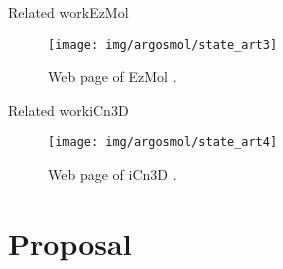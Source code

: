 \documentclass[10pt]{beamer}
\newcommand{\1}{
        	\setbeamertemplate{background}{
        		\texttt{[image: img/1]}
        		\tikz[overlay] \fill[fill opacity=0.75,fill=white] (0,0) rectangle (-\paperwidth,\paperheight);
        	}
}
\begin{document}
\begin{frame}{Related work}{EzMol}	
	\begin{figure}
		\centering
		\texttt{[image: img/argosmol/state\_art3]}
		\caption{Web page of EzMol \cite{reynolds2018ezmol}.}
	\end{figure}
\end{frame}

\begin{frame}{Related work}{iCn3D}	
	\begin{figure}
		\centering
		\texttt{[image: img/argosmol/state\_art4]}
		\caption{Web page of iCn3D \cite{wang2020icn3d}.}
	\end{figure}
\end{frame}




\section{Proposal}

\end{document}
